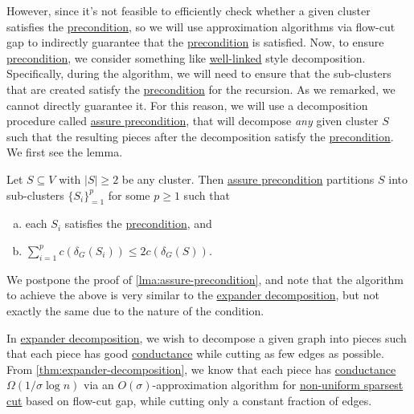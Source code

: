 However, since it's not feasible to efficiently check whether a given cluster satisfies the \hyperref[def:precondition]{precondition}, so we will use approximation algorithms via flow-cut gap to indirectly guarantee that the \hyperref[def:precondition]{precondition} is satisfied. Now, to ensure \hyperref[def:precondition]{precondition}, we consider something like \hyperref[def:well-linked]{well-linked} style decomposition. Specifically, during the algorithm, we will need to ensure that the sub-clusters that are created satisfy the \hyperref[def:precondition]{precondition} for the recursion. As we remarked, we cannot directly guarantee it. For this reason, we will use a decomposition procedure called \hyperref[algo:assure-precondition]{assure precondition}, that will decompose \emph{any} given cluster \(S\) such that the resulting pieces after the decomposition satisfy the \hyperref[def:precondition]{precondition}. We first see the lemma.

\begin{lemma}\label{lma:assure-precondition}
	Let \(S \subseteq V\) with \(\lvert S \rvert \geq 2\) be any cluster. Then \hyperref[algo:assure-precondition]{assure precondition} partitions \(S\) into sub-clusters \(\{S_i\}_{=1}^{p}\) for some \(p \geq 1\) such that
	\begin{enumerate}[(a)]
		\item\label{lma:assure-precondition-a} each \(S_i\) satisfies the \hyperref[def:precondition]{precondition}, and
		\item\label{lma:assure-precondition-b} \(\sum_{i=1}^{p} c(\delta _G(S_i)) \leq 2c(\delta _G(S))\).
	\end{enumerate}
\end{lemma}

We postpone the proof of \autoref{lma:assure-precondition}, and note that the algorithm to achieve the above is very similar to the \hyperref[algo:expander-decomposition]{expander decomposition}, but not exactly the same due to the nature of the condition.

\begin{prev}
	In \hyperref[algo:expander-decomposition]{expander decomposition}, we wish to decompose a given graph into pieces such that each piece has good \hyperref[def:conductance]{conductance} while cutting as few edges as possible. From \autoref{thm:expander-decomposition}, we know that each piece has \hyperref[def:conductance]{conductance} \(\Omega (1 / \sigma \log n)\) via an \(O(\sigma )\)-approximation algorithm for \hyperref[prb:non-uniform-sparsest-cut]{non-uniform sparsest cut} based on flow-cut gap, while cutting only a constant fraction of edges.
\end{prev}

